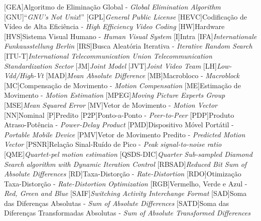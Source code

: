 \begin{acronym}
[GEA]{Algoritmo de Eliminação Global - \textit{Global Elimination Algorithm}}
[GNU]{``\textit{GNU's Not Unix}!''}
[GPL]{\textit{General Public License}}
[HEVC]{Codificação de Vídeo de Alta Eficiência - \textit{High Efficiency Video Coding}}
[HW]{Hardware}
[HVS]{Sistema Visual Humano - \textit{Human Visual System}}
[I]{Intra}
[IFA]{\textit{Internationale Funkausstellung Berlin}}
[IRS]{Busca Aleatória Iterativa - \textit{Iterative Random Search}}
[ITU-T]{\textit{International Telecommunication Union Telecommunication Standardization Sector}}
[JM]{\textit{Joint Model}}
[JVT]{\textit{Joint  Video Team}}
[LH]{\textit{Low-Vdd/High-Vt}}
[MAD]{\textit{Mean Absolute Difference}}
[MB]{Macrobloco - \textit{Macroblock}}
[MC]{Compensação de Movimento - \textit{Motion Compensation}}
[ME]{Estimação de Movimento - \textit{Motion Estimation}}
[MPEG]{\textit{Moving Picture Experts Group}}
[MSE]{\textit{Mean Squared Error}}
[MV]{Vetor de Movimento - \textit{Motion Vector}}
[NN]{Nominal}
[P]{Predito}
[P2P]{Ponto-a-Ponto - \textit{Peer-to-Peer}}
[PDP]{Produto Atraso-Potência - \textit{Power-Delay Product}}
[PMD]{Dispositivo Móvel Portátil - \textit{Portable Mobile Device}}
[PMV]{Vetor de Movimento Predito - \textit{Predicted Motion Vector}}
[PSNR]{Relação Sinal-Ruído de Pico - \textit{Peak signal-to-noise ratio}}
[QME]{\textit{Quartet-pel motion estimation}}
[QSDS-DIC]{\textit{Quarter Sub-sampled Diamond Search algorithm with Dynamic Iteration Control}}
[RBSAD]{\textit{Reduced Bit Sum of Absolute Differences}}
[RD]{Taxa-Distorção - \textit{Rate-Distortion}}
[RDO]{Otimização Taxa-Distorção - \textit{Rate-Distortion Optimization}}
[RGB]{Vermelho, Verde e Azul - \textit{Red, Green and Blue}}
[SAIF]{\textit{Switching Activity Interchange Format}}
[SAD]{Soma das Diferenças Absolutas - \textit{Sum of Absolute Differences}}
[SATD]{Soma das Diferenças Transformadas Absolutas - \textit{Sum of Absolute Transformed Differences}}

\end{acronym}
